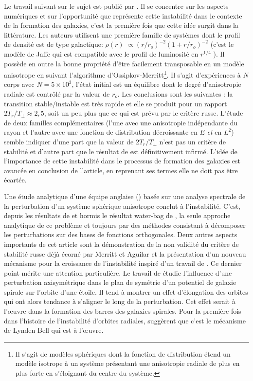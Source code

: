 Le travail suivant sur le sujet est publié par \cite{merritt_aguilar}.
Il se concentre sur les aspects numériques et
sur l'opportunité que représente cette instabilité dans le contexte de la formation des galaxies, c'est la première fois que cette idée surgit dans la
littérature. Les auteurs utilisent une première famille de systèmes dont le profil de densité est \og de type galactique\fg: $\rho\left(  r\right)
$ $\propto (r/r_{o})^{-2}(1+r/r_{o})^{-2}$ (c'est le modèle de Jaffe qui est compatible avec le profil de luminosité en $r^{1/4}$ ). Il possède
en outre la bonne propriété d'être facilement transposable en un modèle anisotrope en suivant l'algorithme d'Ossipkov-Merritt\footnote{Il s'agit de
modèles sphériques dont la fonction de distribution étend un modèle isotrope à un système présentant une anisotropie radiale de plus en plus forte en
s'éloignant du centre du système.}. Il s'agit d'expériences à $N$ corps avec $N=5\times10^{3}$, l'état initial est un équilibre dont le degré
d'anisotropie radiale est contrôlé par la valeur de $r_{o}$. Les conclusions sont les suivantes : la transition stable/instable est très rapide et
elle se produit pour un rapport $2T_{r}/T_{\perp}\approx2,5$, soit un peu plus que ce qui est prévu par le critère russe. L'étude de deux familles
complémentaires (l'une avec une anisotropie indépendante du rayon et l'autre avec une fonction de distribution décroissante en $E$ \emph{et} en
$L^{2}$) semble indiquer d'une part que la valeur de $2T_{r}/T_{\perp}$ n'est pas un critère de stabilité et d'autre part que le résultat
de \cite{waterbag} est définitivement infirmé. L'idée de l'importance de cette instabilité dans le processus de formation des galaxies
est avancée en conclusion de l'article, en reprenant ses termes \og elle ne doit pas être écartée\fg.

Une étude analytique d'une équipe anglaise (\cite{palmerpapa}) basée sur une analyse spectrale de la perturbation d'un système sphérique anisotrope
conclut à l'instabilité. C'est, depuis les résultats de \cite{polyach} et hormis le résultat water-bag de \cite{waterbag}, la seule approche
analytique de ce problème et toujours par des méthodes consistant à décomposer les perturbations sur des bases de fonctions orthogonales.
Deux autres aspects importants de cet article sont la démonstration de la non validité du critère de stabilité russe déjà écorné par Merritt
et Aguilar et la présentation d'un nouveau mécanisme pour la croissance de l'instabilité inspiré d'un travail de \cite{lyndenbell}. Ce dernier point
mérite une attention particulière. Le travail de \cite{lyndenbell} étudie l'influence d'une perturbation axisymétrique dans le plan de symétrie d'un
potentiel de galaxie spirale sur l'orbite d'une étoile. Il tend à montrer un effet d'élongation des orbites qui ont alors tendance à s'aligner le long
de la perturbation. Cet effet serait à l'œuvre dans la formation des barres des galaxies spirales. Pour la première fois dans l'histoire de
l'instabilité d'orbites radiales, \cite{palmerpapa} suggèrent que c'est le mécanisme de Lynden-Bell qui est à l'œuvre.

